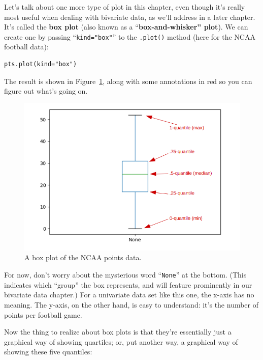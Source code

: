 
Let's talk about one more type of plot in this chapter, even though it's really
most useful when dealing with bivariate data, as we'll address in a later
chapter. It's called the \textbf{box plot} (also known as a
``\textbf{box-and-whisker'' plot}). We can create one by passing
``\texttt{kind="box"}'' to the \texttt{.plot()} method (here for the NCAA
football data):

\begin{Verbatim}[fontsize=\small,samepage=true,frame=single,framesep=3mm]
pts.plot(kind="box")
\end{Verbatim}

The result is shown in Figure~\ref{fig:ncaaBox}, along with some annotations in
red so you can figure out what's going on.

\begin{figure}[ht]
\centering
\includegraphics[width=1\textwidth]{ncaaboxAnnotated.png}
\caption{A box plot of the NCAA points data.}
\label{fig:ncaaBox}
\end{figure}

For now, don't worry about the mysterious word ``\texttt{None}'' at the bottom.
(This indicates which ``group'' the box represents, and will feature
prominently in our bivariate data chapter.) For a univariate data set like this
one, the x-axis has no meaning. The y-axis, on the other hand, is easy to
understand: it's the number of points per football game.


Now the thing to realize about box plots is that they're essentially just a
graphical way of showing quartiles; or, put another way, a graphical way of
showing these five quantiles:

